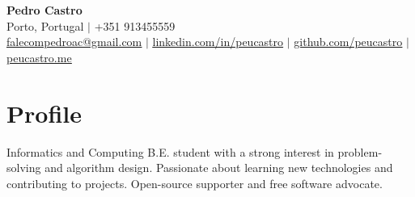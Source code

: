 






\begin{center}
  \textbf{\Huge Pedro Castro} \\ \vspace{6pt}
  \faMapMarker*{} \small{Porto, Portugal} \hspace{0.5pt} $|$ \hspace{0.5pt} \faPhone{} +351
  913455559 \\ \vspace{2pt}
  \faEnvelope{}
  \href{mailto:falecompedroac@gmail.com}{\underline{falecompedroac@gmail.com}}
  \hspace{0.5pt} $|$ \hspace{0.5pt}
  \faLinkedin{}
  \href{https://linkedin.com/in/peucastro}{\underline{linkedin.com/in/peucastro}}
  \hspace{0.5pt} $|$ \hspace{0.5pt}
  \faGithub{}
  \href{https://github.com/peucastro}{\underline{github.com/peucastro}} \hspace{0.5pt} $|$ \hspace{0.5pt}
  \faGlobe{}
  \href{https://peucastro.me}{\underline{peucastro.me}}
\end{center}

\section{Profile}
\begin{itemize}[leftmargin=0.15in, label={}]
    \small{
    \item{
        Informatics and Computing B.E. student with a strong
        interest in problem-solving and algorithm design.
        Passionate about learning new technologies and contributing
        to projects. Open-source supporter and free software advocate.
    }}
\end{itemize}

